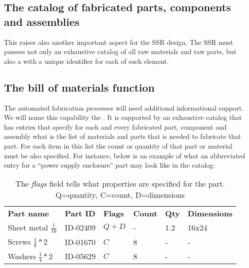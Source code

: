 \subsection[The catalog of fabricated parts, components and
assemblies]{The catalog of fabricated parts, components and assemblies}

This raises also another
important aspect for the SSR design. The SSR must possess not only an
exhaustive catalog of all raw materials and raw parts, but also a
with a unique identifier for each  of such element. 

\subsection[The bill of materials function]{The bill of materials
function}

The automated fabrication
processes will need additional informational support. We will name this
capability the . It is supported by
an exhaustive catalog that has entries that specify for each and every
fabricated part, component and assembly what is the list of materials
and parts that is needed to fabricate that part. For each item in this
list the count or quantity of that part or material must be also
specified. For instance, below is an example of what an abbreviated
entry for a “power supply enclosure” part may look like in the catalog:

\begin{table}[h]
\caption{Example Entries in the Bill of Materials Catalog for the ``Power Supply Enclosure'' part}
\begin{center}
\begin{tabular}{| l l l l l l |}
\hline
\textbf{Part name} &
\textbf{Part ID} &
\textbf{Flags} &
\textbf{Count} &
\textbf{Qty} &
\textbf{Dimensions}\\
Sheet metal $\frac{1}{16}$ &
ID-02409
 &
$Q + D$
 &
- &
1.2
 &
16x24
\\
Screws $\frac{1}{8}*2$ &
ID-01670
 &
$C$
 &
8 &
-
 &
-
\\
Washers $\frac{1}{4}*2$ &
ID-05629
 &
$C$
 &
8 &
-
 &
-
\\\hline
\end{tabular}
\end{center}
\caption*{The \textit{flags} field tells what properties are specified for the part.  Q=quantity, C=count, D=dimensions}
\end{table}

